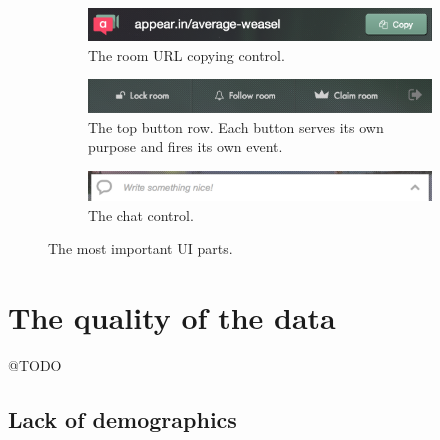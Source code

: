     \begin{figure}[t]
      \centering
      \begin{subfigure}[t]{0.8\textwidth}
        \includegraphics[width=\textwidth]{Figures/screenshots/appearin/feature-copy}
        \caption{The room URL copying control.}
        \label{fig:ui:copy_control}
      \end{subfigure}

      \vspace{.5cm}

      \begin{subfigure}[t]{0.95\textwidth}
        \includegraphics[width=\textwidth]{Figures/screenshots/appearin/feature-buttons-top}
        \caption{The top button row. Each button serves its own purpose and fires its own event.}
        \label{fig:ui:top_buttons}
      \end{subfigure}

      \vspace{.5cm}

      \begin{subfigure}[t]{0.95\textwidth}
        \includegraphics[width=\textwidth]{Figures/screenshots/appearin/feature-chat}
        \caption{The chat control.}
        \label{fig:ui:chat}
      \end{subfigure}

      \caption{The most important UI parts.}
      \label{fig:important_ui_parts}
    \end{figure}


\section{The quality of the data}
\label{survey:data_quality}

  @TODO

  \subsection{Lack of demographics}
  \label{survey:lack_of_demographics}

